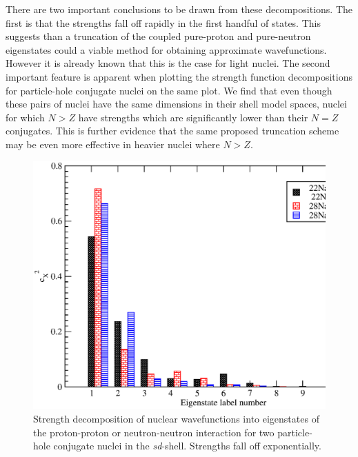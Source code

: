 There are two important conclusions to be drawn from these decompositions. The first is that the strengths
fall off rapidly in the first handful of states. This suggests than
a truncation of the coupled pure-proton and pure-neutron eigenstates could a viable 
method for obtaining approximate wavefunctions. However it is already known that 
this is the case for light nuclei\cite{Papenbrock03,Papenbrock04,Papenbrock05}. The second
important feature is apparent when plotting the strength function
decompositions for particle-hole conjugate nuclei on the same plot. We find that
even though these pairs of nuclei have the same dimensions in their shell model spaces,
nuclei for which $N>Z$ have strengths which are significantly lower than their 
$N=Z$ conjugates. This is further evidence that the same proposed truncation scheme
may be even more effective in heavier nuclei where $N>Z$.

\begin{figure}
    \centering
    \includegraphics[width=4.5in]{Figures/decomp_na}
    \caption{Strength decomposition of nuclear wavefunctions into eigenstates of
    the proton-proton or neutron-neutron interaction for two particle-hole conjugate
    nuclei in the \textit{sd}-shell. Strengths fall off exponentially. } 
    \label{fig: pndecomp1}
\end{figure}


